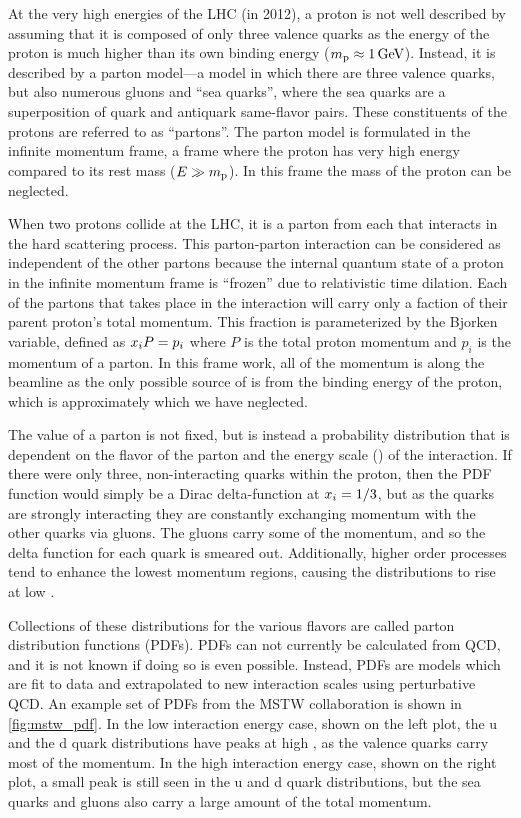 At the very high energies of the LHC (\rootseight in 2012), a proton is not
well described by assuming that it is composed of only three valence quarks as
the energy of the proton is much higher than its own binding energy
($m_{\text{p}} \approx 1 \,\text{Ge\hspace{-.08em}V}$). Instead, it is described by a parton model---a
model in which there are three valence quarks, but also numerous gluons and
``sea quarks'', where the sea quarks are a superposition of quark and antiquark
same-flavor pairs. These constituents of the protons are referred to as
``partons''. The parton model is formulated in the infinite momentum frame, a
frame where the proton has very high energy compared to its rest mass ($E
\gg m_{\text{p}}$). In this frame the mass of the proton can be neglected.

When two protons collide at the LHC, it is a parton from each that interacts in
the hard scattering process. This parton-parton interaction can be considered
as independent of the other partons because the internal quantum state of a
proton in the infinite momentum frame is ``frozen'' due to relativistic time
dilation. Each of the partons that takes place in the interaction will carry
only a faction of their parent proton's total momentum. This fraction is
parameterized by the Bjorken  variable, defined as $x_{i} P
= p_{i}$ where $P$ is the total proton momentum and $p_{i}$ is the momentum of
a parton. In this frame work, all of the momentum is along the beamline as the
only possible source of \pt is from the binding energy of the proton, which is
approximately \ProtonMass which we have neglected.

The  value of a parton is not fixed, but is instead a probability
distribution that is dependent on the flavor of the parton and the energy scale
(\InteractionEnergy) of the interaction. If there were only three,
non-interacting quarks within the proton, then the PDF function would simply be
a Dirac delta-function at $x_{i} = 1/3$, but as the quarks are strongly
interacting they are constantly exchanging momentum with the other quarks via
gluons. The gluons carry some of the momentum, and so the delta function for
each quark is smeared out. Additionally, higher order processes tend to enhance
the lowest momentum regions, causing the distributions to rise at low
.

Collections of these distributions for the various flavors are called parton
distribution functions (PDFs). PDFs can not currently be calculated from QCD,
and it is not known if doing so is even possible. Instead, PDFs are models
which are fit to data and extrapolated to new interaction scales using
perturbative QCD. An example set of PDFs from the MSTW
collaboration\cite{martin_2009} is shown in \cref{fig:mstw_pdf}. In the low
interaction energy case, shown on the left plot, the u and the d quark
distributions have peaks at high , as the valence quarks carry most
of the momentum. In the high interaction energy case, shown on the right plot,
a small peak is still seen in the u and d quark distributions, but the sea
quarks and gluons also carry a large amount of the total momentum.

